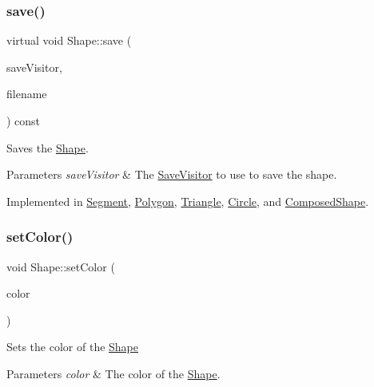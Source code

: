 \subsubsection{\texorpdfstring{save()}{save()}}
{\footnotesize\ttfamily virtual void Shape\+::save (\begin{DoxyParamCaption}\item[{const \hyperlink{class_save_visitor}{Save\+Visitor} $\ast$}]{save\+Visitor,  }\item[{const string \&}]{filename }\end{DoxyParamCaption}) const\hspace{0.3cm}{\ttfamily [pure virtual]}}

Saves the \hyperlink{class_shape}{Shape}. 
\begin{DoxyParams}{Parameters}
{\em save\+Visitor} & The \hyperlink{class_save_visitor}{Save\+Visitor} to use to save the shape. \\
\hline
\end{DoxyParams}


Implemented in \hyperlink{class_segment_a76c475fb193a0d7bb987da60dfc88ccd}{Segment}, \hyperlink{class_polygon_ad9adb867821b71e1aa8130dccbc9b37f}{Polygon}, \hyperlink{class_triangle_ae9ac3d633172f14d391d290a4467e1d3}{Triangle}, \hyperlink{class_circle_a91f2af619cc0465ae297ea88ce3b6c23}{Circle}, and \hyperlink{class_composed_shape_af189684eb5328b2fc13c694d7e637ff8}{Composed\+Shape}.

\hypertarget{class_shape_a9f3d9c69476b41a375161b27949f765c}{}\label{class_shape_a9f3d9c69476b41a375161b27949f765c} 
\subsubsection{\texorpdfstring{set\+Color()}{setColor()}}
{\footnotesize\ttfamily void Shape\+::set\+Color (\begin{DoxyParamCaption}\item[{const \hyperlink{class_color}{Color} \&}]{color }\end{DoxyParamCaption})\hspace{0.3cm}{\ttfamily [virtual]}}

Sets the color of the \hyperlink{class_shape}{Shape} 
\begin{DoxyParams}{Parameters}
{\em color} & The color of the \hyperlink{class_shape}{Shape}. \\
\hline
\end{DoxyParams}
\hypertarget{class_shape_ad3daca0d9bedf9aa15b92afab63c1de8}{}\label{class_shape_ad3daca0d9bedf9aa15b92afab63c1de8} 
